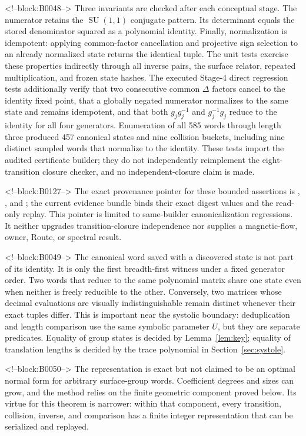 \documentclass[11pt,a4paper]{article}
\theoremstyle{definition}
\newcommand{\SU}{\operatorname{SU}}
\begin{document}
<!--block:B0048-->
Three invariants are checked after each conceptual stage.  The numerator
retains the \(\SU(1,1)\) conjugate pattern.  Its determinant equals the stored
denominator squared as a polynomial identity.  Finally, normalization is
idempotent: applying common-factor cancellation and projective sign selection
to an already normalized state returns the identical tuple.  The unit tests
exercise these properties indirectly through all inverse pairs, the surface
relator, repeated multiplication, and frozen state hashes.  The executed
Stage-4 direct regression tests additionally verify that two consecutive
common \(\Delta\) factors cancel to the identity fixed point, that a globally
negated numerator normalizes to the same state and remains idempotent, and
that both \(g_jg_j^{-1}\) and \(g_j^{-1}g_j\) reduce to the identity for all
four generators.  Enumeration of all 585 words through length three produced
457 canonical states and nine collision buckets, including nine distinct
sampled words that normalize to the identity.  These tests import the audited
certificate builder; they do not independently reimplement the
eight-transition closure checker, and no independent-closure claim is made.

<!--block:B0127-->
The exact provenance pointer for these bounded assertions is
,
, and
; the current evidence bundle
binds their exact digest values and the read-only replay.  This pointer is
limited to same-builder canonicalization regressions.  It neither upgrades
transition-closure independence nor supplies a magnetic-flow, owner, Route,
or spectral result.

<!--block:B0049-->
The canonical word saved with a discovered state is not part of its identity.
It is only the first breadth-first witness under a fixed generator order.
Two words that reduce to the same polynomial matrix share one state even when
neither is freely reducible to the other.  Conversely, two matrices whose
decimal evaluations are visually indistinguishable remain distinct whenever
their exact tuples differ.  This is important near the systolic boundary:
deduplication and length comparison use the same symbolic parameter \(U\), but
they are separate predicates.  Equality of group states is decided by
Lemma~\ref{lem:key}; equality of translation lengths is decided by the trace
polynomial in Section~\ref{sec:systole}.

<!--block:B0050-->
The representation is exact but not claimed to be an optimal normal form for
arbitrary surface-group words.  Coefficient degrees and sizes can grow, and
the method relies on the finite geometric component proved below.  Its virtue
for this theorem is narrower: within that component, every transition,
collision, inverse, and comparison has a finite integer representation that
can be serialized and replayed.
\end{document}
